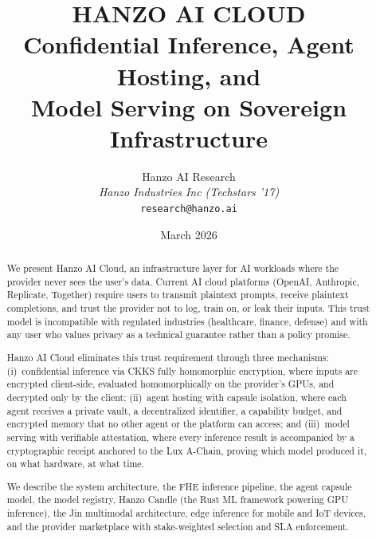 \documentclass[11pt]{article}
\title{HANZO AI CLOUD\\[0.3em]
{\large Confidential Inference, Agent Hosting, and\\Model Serving on Sovereign Infrastructure}}
\author{
    Hanzo AI Research \\
    \textit{Hanzo Industries Inc (Techstars '17)} \\
    \texttt{research@hanzo.ai}
}
\date{March 2026}
\begin{document}
\hanzocoverpage

\begin{abstract}
We present Hanzo AI Cloud, an infrastructure layer for AI workloads where the
provider never sees the user's data. Current AI cloud platforms (OpenAI,
Anthropic, Replicate, Together) require users to transmit plaintext prompts,
receive plaintext completions, and trust the provider not to log, train on, or
leak their inputs. This trust model is incompatible with regulated industries
(healthcare, finance, defense) and with any user who values privacy as a
technical guarantee rather than a policy promise.

Hanzo AI Cloud eliminates this trust requirement through three mechanisms:
(i)~confidential inference via CKKS fully homomorphic encryption, where inputs
are encrypted client-side, evaluated homomorphically on the provider's GPUs,
and decrypted only by the client; (ii)~agent hosting with capsule isolation,
where each agent receives a private vault, a decentralized identifier, a
capability budget, and encrypted memory that no other agent or the platform
can access; and (iii)~model serving with verifiable attestation, where every
inference result is accompanied by a cryptographic receipt anchored to the Lux
A-Chain, proving which model produced it, on what hardware, at what time.

We describe the system architecture, the FHE inference pipeline, the agent
capsule model, the model registry, Hanzo Candle (the Rust ML framework
powering GPU inference), the Jin multimodal architecture, edge inference for
mobile and IoT devices, and the provider marketplace with stake-weighted
selection and SLA enforcement.
\end{abstract}













\end{document}
